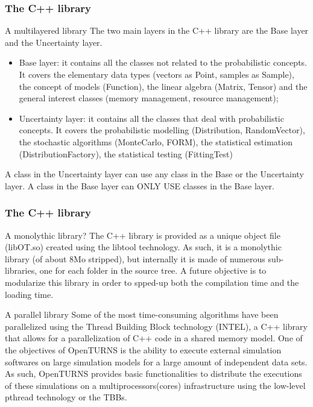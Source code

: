 \documentclass[8pt]{beamer}
\begin{document}
\begin{frame}
  \frametitle{The C++ library}
  \begin{block}{A multilayered library}
    The two main layers in the C++ library are the \alert{Base} layer and the \alert{Uncertainty} layer.
    \begin{itemize}
    \item \alert{Base} layer: it contains all the classes not related to the probabilistic concepts. It covers the elementary data types (vectors as Point, samples as Sample), the concept of models (Function), the linear algebra (Matrix, Tensor) and the general interest classes (memory management, resource management);
    \item \alert{Uncertainty} layer: it contains all the classes that deal with probabilistic concepts. It covers the probabilistic modelling (Distribution, RandomVector), the stochastic algorithms (MonteCarlo, FORM), the statistical estimation (DistributionFactory), the statistical testing (FittingTest)
    \end{itemize}
    A class in the Uncertainty layer can use any class in the Base or the Uncertainty layer. A class in the Base layer can ONLY USE classes in the Base layer.
  \end{block}
\end{frame}
\begin{frame}
  \frametitle{The C++ library}
  \begin{block}{A monolythic library?}
    The C++ library is provided as a unique object file (libOT.so) created using the libtool technology. As such, it is a monolythic library (of about 8Mo stripped), but internally it is made of numerous sub-libraries, one for each folder in the source tree. A future objective is to modularize this library in order to spped-up both the compilation time and the loading time.
  \end{block}
  \begin{block}{A parallel library}
    Some of the most time-consuming algorithms have been parallelized using the Thread Building Block technology (INTEL), a C++ library that allows for a parallelization of C++ code in a shared memory model. One of the objectives of OpenTURNS is the ability to execute external simulation softwares on large simulation models for a large amount of independent data sets. As such, OpenTURNS provides basic functionalities to distribute the executions of these simulations on a multiprocessors(cores) infrastructure using the low-level pthread technology or the TBBs.
  \end{block}
\end{frame}
\end{document}
